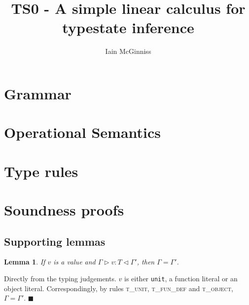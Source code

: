 \documentclass{article}
\newtheorem{lem}{Lemma}
\newcommand{\typerule}[4]{#1 \triangleright #2 : #3 \triangleleft #4}
\newcommand{\qed}{$\blacksquare$}
\newenvironment{proof}{\vspace{1ex}\noindent{\bf Proof}\hspace{0.5em}}
  {\hfill\qed\vspace{1ex}}
\begin{document}
\title{TS0 - A simple linear calculus for typestate inference}
\author{Iain McGinniss}

\section{Grammar}

\ottgrammartabular{
\ottt\ottinterrule
\ottv\ottinterrule
\otto\ottinterrule
\ottsv\ottinterrule
\ottT\ottinterrule
\ottst\ottinterrule
\ottO\ottinterrule
}

\section{Operational Semantics}

\ottgrammartabular{
\ottmu\ottinterrule
}

\ottdefnvalidstore

\ottdefnreduce

\section{Type rules}
\label{sec:typerules}

\ottgrammartabular{
\ottG\ottinterrule
\ottT\ottinterrule
}

\ottdefnvalidgamma

\ottdefnstoretype

\ottdefnmethtype

\ottdefntype

\section{Soundness proofs}

\subsection{Supporting lemmas}

\begin{lem}
\label{lem:valuectx}
If $v$ is a value and $\typerule{\Gamma}{v}{T}{\Gamma'}$, then $\Gamma = \Gamma'$.
\end{lem}
\begin{proof}
Directly from the typing judgements. $v$ is either {\tt unit}, a function
literal or an object literal. Correspondingly, by rules \textsc{t\_unit},
\textsc{t\_fun\_def} and \textsc{t\_object}, $\Gamma = \Gamma'$.
\end{proof}
\end{document}
